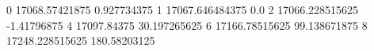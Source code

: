 0 17068.57421875 0.927734375
1 17067.646484375 0.0
2 17066.228515625 -1.41796875
4 17097.84375 30.197265625
6 17166.78515625 99.138671875
8 17248.228515625 180.58203125

